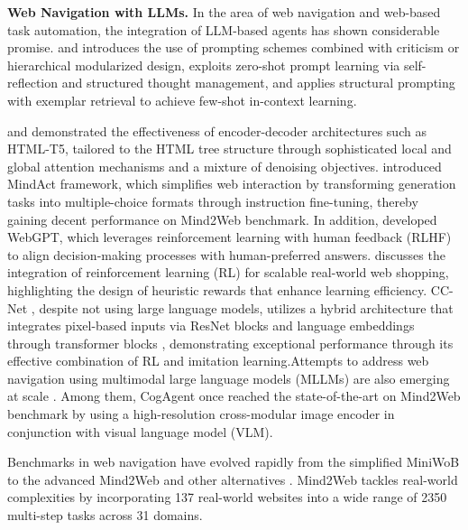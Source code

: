 \documentclass{article}
\begin{document}
  \textbf{Web Navigation with LLMs.} In the area of web navigation and web-based task automation, the integration of LLM-based agents has shown considerable promise. \citet{kim2024language} and \citet{sridhar2023hierarchical} introduces the use of prompting schemes combined with criticism or hierarchical modularized design, \citet{li2023zero} exploits zero-shot prompt learning via self-reflection and structured thought management, and \citet{zheng2023synapse} applies structural prompting with exemplar retrieval to achieve few-shot in-context learning.
  
  \citet{gur2023real} and \citet{gur2023understanding} demonstrated the effectiveness of encoder-decoder architectures such as HTML-T5, tailored to the HTML tree structure through sophisticated local and global attention mechanisms and a mixture of denoising objectives. \citet{deng2024mind2web} introduced MindAct framework, which simplifies web interaction by transforming generation tasks into multiple-choice formats through instruction fine-tuning, thereby gaining decent performance on Mind2Web benchmark. In addition, \citet{nakano2021webgpt} developed WebGPT, which leverages reinforcement learning with human feedback (RLHF) \citep{ouyang2022training,ziegler2019fine} to align decision-making processes with human-preferred answers. \citet{yao2022webshop} discusses the integration of reinforcement learning (RL) for scalable real-world web shopping, highlighting the design of heuristic rewards that enhance learning efficiency. CC-Net \citep{humphreys2022data}, despite not using large language models, utilizes a hybrid architecture that integrates pixel-based inputs via ResNet \citep{he2016deep} blocks and language embeddings through transformer blocks \citep{vaswani2017attention}, demonstrating exceptional performance through its effective combination of RL and imitation learning.Attempts to address web navigation using multimodal large language models (MLLMs) are also emerging at scale \citep{hong2023cogagent,you2024ferret,wang2024mobile,niu2024screenagent,baechler2024screenai,cheng2024seeclick,furuta2023multimodal}. Among them, CogAgent once reached the state-of-the-art on Mind2Web benchmark by using a high-resolution cross-modular image encoder in conjunction with visual language model (VLM).
  
  Benchmarks in web navigation have evolved rapidly from the simplified MiniWoB \citep{shi2017world} to the advanced Mind2Web \citep{deng2024mind2web} and other alternatives \citep{lu2024weblinx,zhou2023webarena,he2024webvoyager}. Mind2Web tackles real-world complexities by incorporating 137 real-world websites into a wide range of 2350 multi-step tasks across 31 domains. 
  
\end{document}
